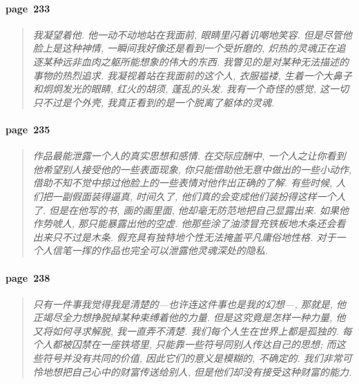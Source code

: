 \paragraph*{page~233}
\begin{quotation}
    \itshape
    我凝望着他. 他一动不动地站在我面前, 眼睛里闪着讥嘲地笑容. 但是尽管他脸上是这种神情, 一瞬间我好像还是看到一个受折磨的, 炽热的灵魂正在追逐某种远非血肉之躯所能想象的伟大的东西. 我瞥见的是对某种无法描述的事物的热烈追求. 我凝视着站在我面前的这个人, 衣服褴褛, 生着一个大鼻子和炯炯发光的眼睛, 红火的胡须, 蓬乱的头发. 我有一个奇怪的感觉, 这一切只不过是个外壳, 我真正看到的是一个脱离了躯体的灵魂. 
\end{quotation}

\paragraph*{page~235}
\begin{quotation}
    \itshape
    作品最能泄露一个人的真实思想和感情. 在交际应酬中, 一个人之让你看到他希望别人接受他的一些表面现象, 你只能借助他无意中做出的一些小动作, 借助不知不觉中掠过他脸上的一些表情对他作出正确的了解. 有些时候, 人们把一副假面装得逼真, 时间久了, 他们真的会变成他们装扮得这样一个人了. 但是在他写的书, 画的画里面, 他却毫无防范地把自己显露出来. 如果他作势唬人, 那只能暴露出他的空虚. 他那些涂了油漆冒充铁板地木条还会看出来只不过是木条. 假充具有独特地个性无法掩盖平凡庸俗地性格. 对于一个人信笔一挥的作品也完全可以泄露他灵魂深处的隐私.
\end{quotation}

\paragraph*{page~238}
\begin{quotation}
    \itshape
    只有一件事我觉得我是清楚的---也许连这件事也是我的幻想---, 那就是, 他正竭尽全力想挣脱掉某种束缚着他的力量. 但是这究竟是怎样一种力量, 他又将如何寻求解脱, 我一直弄不清楚. 我们每个人生在世界上都是孤独的. 每个人都被囚禁在一座铁塔里, 只能靠一些符号同别人传达自己的思想; 而这些符号并没有共同的价值, 因此它们的意义是模糊的, 不确定的. 我们非常可怜地想把自己心中的财富传送给别人, 但是他们却没有接受这种财富的能力. 
\end{quotation}

